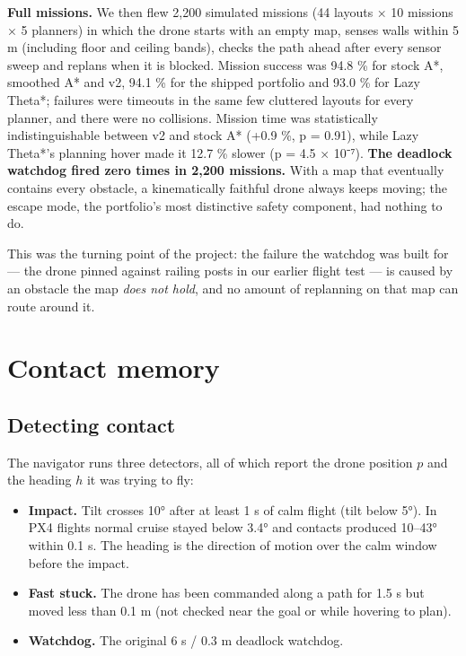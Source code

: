 \documentclass[
]{article}
\providecommand{\tightlist}{%
  \setlength{\itemsep}{0pt}\setlength{\parskip}{0pt}}
\begin{document}
\textbf{Full missions.} We then flew 2,200 simulated missions (44
layouts × 10 missions × 5 planners) in which the drone starts with an
empty map, senses walls within 5 m (including floor and ceiling bands),
checks the path ahead after every sensor sweep and replans when it is
blocked. Mission success was 94.8 \% for stock A*, smoothed A* and v2,
94.1 \% for the shipped portfolio and 93.0 \% for Lazy Theta*; failures
were timeouts in the same few cluttered layouts for every planner, and
there were no collisions. Mission time was statistically
indistinguishable between v2 and stock A* (+0.9 \%, p = 0.91), while
Lazy Theta*'s planning hover made it 12.7 \% slower (p = 4.5 × 10⁻⁷).
\textbf{The deadlock watchdog fired zero times in 2,200 missions.} With
a map that eventually contains every obstacle, a kinematically faithful
drone always keeps moving; the escape mode, the portfolio's most
distinctive safety component, had nothing to do.

This was the turning point of the project: the failure the watchdog was
built for --- the drone pinned against railing posts in our earlier
flight test --- is caused by an obstacle the map \emph{does not hold},
and no amount of replanning on that map can route around it.

\section{Contact memory}\label{contact-memory}

\subsection{Detecting contact}\label{detecting-contact}

The navigator runs three detectors, all of which report the drone
position \(p\) and the heading \(h\) it was trying to fly:

\begin{itemize}
\tightlist
\item
  \textbf{Impact.} Tilt crosses 10° after at least 1 s of calm flight
  (tilt below 5°). In PX4 flights normal cruise stayed below 3.4° and
  contacts produced 10--43° within 0.1 s. The heading is the direction
  of motion over the calm window before the impact.
\item
  \textbf{Fast stuck.} The drone has been commanded along a path for 1.5
  s but moved less than 0.1 m (not checked near the goal or while
  hovering to plan).
\item
  \textbf{Watchdog.} The original 6 s / 0.3 m deadlock watchdog.
\end{itemize}
\end{document}
